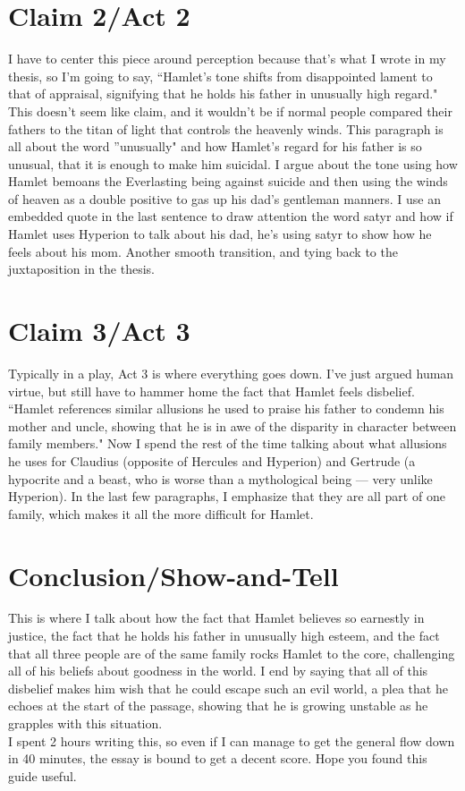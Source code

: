 \documentclass[11pt]{article}
\begin{document}
\section{Claim 2/Act 2}
I have to center this piece around perception because that's what I wrote in my thesis, so I'm going to say, \color{blue} ``Hamlet's tone shifts from disappointed lament to that of appraisal, signifying that he holds his father in unusually high regard."
\color{black}This doesn't seem like claim, and it wouldn't be if normal people compared their fathers to the titan of light that controls the heavenly winds.
This paragraph is all about the word ''unusually" and how Hamlet's regard for his father is so unusual, that it is enough to make him suicidal.
I argue about the tone using how Hamlet bemoans the Everlasting being against suicide and then using the winds of heaven as a double positive to gas up his dad's gentleman manners.
\color{blue} I use an embedded quote in the last sentence to draw attention the word satyr and how if Hamlet uses Hyperion to talk about his dad, he's using satyr to show how he feels about his mom. Another smooth transition, and tying back to the juxtaposition in the thesis.
\color{black}
\section{Claim 3/Act 3}
Typically in a play, Act 3 is where everything goes down. I've just argued human virtue, but still have to hammer home the fact that Hamlet feels disbelief.\color{blue} ``Hamlet references similar allusions he used to praise his father to condemn his mother and uncle, showing that he is in awe of the disparity in character between family members."
\color{black} Now I spend the rest of the time talking about what allusions he uses for Claudius (opposite of Hercules and Hyperion) and Gertrude (a hypocrite and a beast, who is worse than a mythological being --- very unlike Hyperion). In the last few paragraphs, I emphasize that they are all part of one family, which makes it all the more difficult for Hamlet.

\section{Conclusion/Show-and-Tell}
This is where I talk about how the fact that Hamlet believes so earnestly in justice, the fact that he holds his father in unusually high esteem, and the fact that all three people are of the same family rocks Hamlet to the core, challenging all of his beliefs about goodness in the world. I end by saying that all of this disbelief makes him wish that he could escape such an evil world, a plea that he echoes at the start of the passage, showing that he is growing unstable as he grapples with this situation.\\

I spent 2 hours writing this, so even if I can manage to get the general flow down in 40 minutes, the essay is bound to get a decent score. Hope you found this guide useful.
\end{document}
